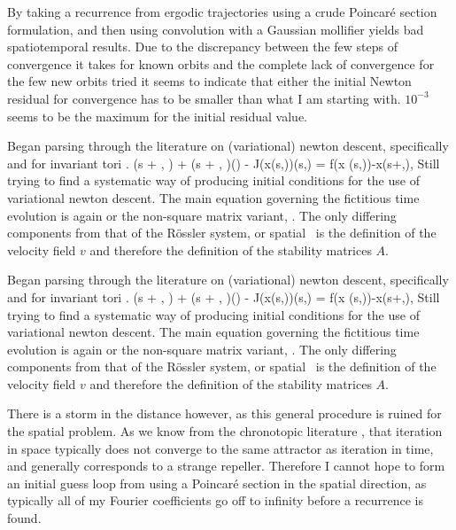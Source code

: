 By taking a recurrence from ergodic trajectories using a crude Poincar\'e section
formulation, and then using convolution with a Gaussian mollifier yields bad
spatiotemporal results. Due to the discrepancy between the few steps of convergence
it takes for known orbits and the complete lack of convergence for the few new orbits
tried it seems to indicate that either the initial Newton residual for convergence has
to be smaller than what I am starting with. $10^{-3}$ seems to be the maximum
for the initial residual value.

Began parsing through the literature on (variational) {newton descent},
specifically  and for invariant tori
.
\beq
{}(s + \omega, \tau) + (s + \omega, \tau)\frac{\partial \omega}{\partial \tau}(\tau) - J(x(s,\tau))(s,\tau) =
f(x (s,\tau))-x(s+\omega,\tau),
Still trying to find a systematic way of producing initial conditions for
the use of variational {newton descent}. The main equation governing the
fictitious time evolution is again  or the non-square
matrix variant, . The only differing components
from that of the R\"ossler system, or spatial \KS\ is the definition of
the velocity field $v$ and therefore the definition of the stability
matrices $A$.

Began parsing through the literature on (variational) {newton descent},
specifically  and for invariant tori
.
\beq
{}(s + \omega, \tau) + (s + \omega, \tau)\frac{\partial \omega}{\partial \tau}(\tau) - J(x(s,\tau))(s,\tau) =
f(x (s,\tau))-x(s+\omega,\tau),
Still trying to find a systematic way of producing initial conditions for
the use of variational {newton descent}. The main equation governing the
fictitious time evolution is again  or the non-square
matrix variant, . The only differing components
from that of the R\"ossler system, or spatial \KS\ is the definition of
the velocity field $v$ and therefore the definition of the stability
matrices $A$.

There is a storm in the distance however, as this general procedure is ruined for the spatial problem.
As we know from the chronotopic literature ,
that iteration in space typically does not converge to the same attractor as iteration in time,
and generally corresponds to a strange repeller. Therefore I cannot hope to form an initial
guess loop from using a Poincar\'e section in the spatial direction, as typically all of my
Fourier coefficients go off to infinity before a recurrence is found.

